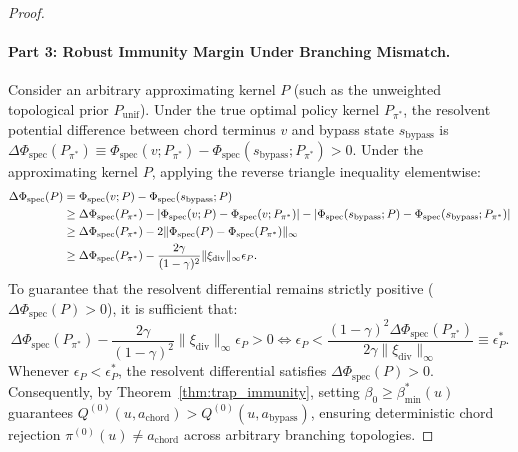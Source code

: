 \documentclass[11pt,a4paper]{article}
\begin{document}
\begin{proof}
\paragraph{Part 3: Robust Immunity Margin Under Branching Mismatch.}
Consider an arbitrary approximating kernel $P$ (such as the unweighted topological prior $P_{\text{unif}}$). 
Under the true optimal policy kernel $P_{\pi^*}$, the resolvent potential difference between chord terminus $v$ and bypass state $s_{\text{bypass}}$ is $\Delta \Phi_{\text{spec}}(P_{\pi^*}) \equiv \Phi_{\text{spec}}(v; P_{\pi^*}) - \Phi_{\text{spec}}(s_{\text{bypass}}; P_{\pi^*}) > 0$.
Under the approximating kernel $P$, applying the reverse triangle inequality elementwise:
\begin{align}
\Delta \Phi_{\text{spec}}(P) &= \Phi_{\text{spec}}(v; P) - \Phi_{\text{spec}}(s_{\text{bypass}}; P) \notag \\
&\ge \Delta \Phi_{\text{spec}}(P_{\pi^*}) - \left| \Phi_{\text{spec}}(v; P) - \Phi_{\text{spec}}(v; P_{\pi^*}) \right| - \left| \Phi_{\text{spec}}(s_{\text{bypass}}; P) - \Phi_{\text{spec}}(s_{\text{bypass}}; P_{\pi^*}) \right| \notag \\
&\ge \Delta \Phi_{\text{spec}}(P_{\pi^*}) - 2 \|\Phi_{\text{spec}}(P) - \Phi_{\text{spec}}(P_{\pi^*})\|_\infty \notag \\
&\ge \Delta \Phi_{\text{spec}}(P_{\pi^*}) - \frac{2 \gamma}{(1 - \gamma)^2} \|\xi_{\text{div}}\|_\infty \epsilon_P.
\end{align}
To guarantee that the resolvent differential remains strictly positive ($\Delta \Phi_{\text{spec}}(P) > 0$), it is sufficient that:
\begin{equation}
\Delta \Phi_{\text{spec}}(P_{\pi^*}) - \frac{2 \gamma}{(1 - \gamma)^2} \|\xi_{\text{div}}\|_\infty \epsilon_P > 0 \iff \epsilon_P < \frac{(1 - \gamma)^2 \Delta \Phi_{\text{spec}}(P_{\pi^*})}{2 \gamma \|\xi_{\text{div}}\|_\infty} \equiv \epsilon_P^*.
\end{equation}
Whenever $\epsilon_P < \epsilon_P^*$, the resolvent differential satisfies $\Delta \Phi_{\text{spec}}(P) > 0$. Consequently, by Theorem~\ref{thm:trap_immunity}, setting $\beta_0 \ge \beta_{\min}^*(u)$ guarantees $Q^{(0)}(u, a_{\text{chord}}) > Q^{(0)}(u, a_{\text{bypass}})$, ensuring deterministic chord rejection $\pi^{(0)}(u) \ne a_{\text{chord}}$ across arbitrary branching topologies.


\end{proof}
\end{document}

